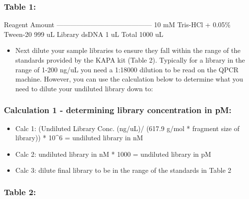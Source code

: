 \documentclass[
  letterpaper,
  DIV=11,
  numbers=noendperiod]{scrreprt}
\providecommand{\tightlist}{%
  \setlength{\itemsep}{0pt}\setlength{\parskip}{0pt}}\usepackage{longtable,booktabs,array}
\begin{document}
\hypertarget{table-1}{%
\subsubsection*{\texorpdfstring{\textbf{Table
1:}}{Table 1:}}\label{table-1}}

\textbar{} Reagent \textbar{} Amount \textbar{}
\textbar---------------------------------\textbar---------\textbar{}
\textbar{} 10 mM Tris-HCl + 0.05\% Tween-20 \textbar{} 999 uL \textbar{}
\textbar{} Library dsDNA \textbar{} 1 uL \textbar{} \textbar{} Total
\textbar{} 1000 uL \textbar{}

\begin{itemize}
\tightlist
\item
  Next dilute your sample libraries to ensure they fall within the range
  of the standards provided by the KAPA kit (Table 2). Typically for a
  library in the range of 1-200 ng/uL you need a 1:18000 dilution to be
  read on the QPCR machine. However, you can use the calculation below
  to determine what you need to dilute your undiluted library down to:
\end{itemize}

\hypertarget{calculation-1---determining-library-concentration-in-pm}{%
\subsubsection*{\texorpdfstring{\textbf{Calculation 1 - determining
library concentration in
pM:}}{Calculation 1 - determining library concentration in pM:}}\label{calculation-1---determining-library-concentration-in-pm}}

\begin{itemize}
\item
  Calc 1: (Undiluted Library Conc. (ng/uL)/ (617.9 g/mol * fragment size
  of library)) * 10\^{}6 = undiluted library in nM
\item
  Calc 2: undiluted library in nM * 1000 = undiluted library in pM
\item
  Calc 3: dilute final library to be in the range of the standards in
  Table 2
\end{itemize}

\hypertarget{table-2}{%
\subsubsection*{\texorpdfstring{\textbf{Table
2:}}{Table 2:}}\label{table-2}}
\end{document}
